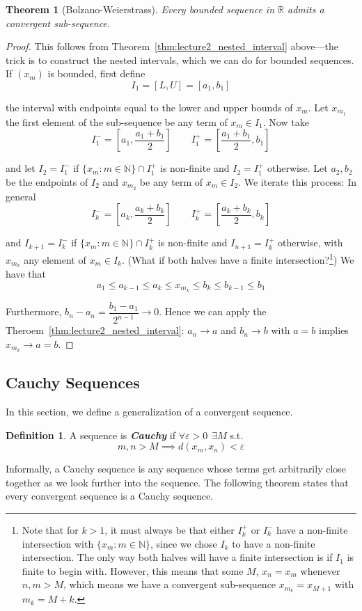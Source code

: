 \documentclass{article}
\newcommand{\R}{\mathbb{R}}
\newcommand{\N}{\mathbb{N}}
\newcommand{\keyword}[1]{\textit{\textbf{#1}}\index{#1}}
\newtheorem{theorem}{Theorem}
\theoremstyle{definition}
\newtheorem{definition}{Definition}
\begin{document}
\begin{theorem}[Bolzano-Weierstrass]
  Every bounded sequence in $\R$ admits a convergent sub-sequence.
\end{theorem}

\begin{proof}
  This follows from Theorem~\ref{thm:lecture2_nested_interval} above---the trick is to construct the nested intervals, which we can do for bounded sequences. If $(x_m)$ is bounded, first define
  \[
    I_1 = [L, U] = [a_1, b_1]
  \]

  the interval with endpoints equal to the lower and upper bounds of $x_m$. Let $x_{m_1}$ the first element of the sub-sequence be any term of $x_m \in I_1$. Now take
  \[
    I_1^- = \left[a_1, \dfrac{a_1 + b_1}{2}\right]
    \quad\quad
    I_1^+ = \left[\dfrac{a_1 + b_1}{2}, b_1\right]
  \]

  and let $I_2 = I_1^-$ if $\{x_m: m \in \N\} \cap I_1^+$ is non-finite and $I_2 = I_1^+$ otherwise. Let $a_2, b_2$ be the endpoints of $I_2$ and $x_{m_2}$ be any term of $x_m \in I_2$. We iterate this process: In general
  \[
    I_k^- = \left[a_k, \dfrac{a_k + b_k}{2}\right]
    \quad\quad
    I_k^+ = \left[\dfrac{a_k + b_k}{2}, b_k\right]
  \]

  and $I_{k + 1} = I_k^-$ if $\{x_m: m \in \N\} \cap I_k^+$ is non-finite and $I_{n + 1} = I_k^+$ otherwise, with $x_{m_k}$ any element of $x_m \in I_k$. (What if both halves have a finite intersection?\footnote{Note that for $k > 1$, it must always be that either $I_k^+$ or $I_k^-$ have a non-finite intersection with $\{x_m: m \in \mathbb{N}\}$, since we chose $I_k$ to have a non-finite intersection.  The only way both halves will have a finite intersection is if $I_1$ is finite to begin with. However, this means that some $M$, $x_n = x_m$ whenever $n, m > M$, which means we have a convergent sub-sequence $x_{m_k} = x_{M + 1}$ with $m_k = M + k$.}) We have that
  \[
    a_1 \le a_{k - 1} \le a_k \le x_{m_k} \le b_k \le b_{k - 1} \le b_1
  \]

  Furthermore, $b_n - a_n = \dfrac{b_1 - a_1}{2^{n - 1}} \to 0$. Hence we can apply the Theroem~\ref{thm:lecture2_nested_interval}: $a_n \to a$ and $b_n \to b$ with $a = b$ implies $x_{m_k} \to a = b$.
\end{proof}

\subsection{Cauchy Sequences}
\label{ssub:cauchy_sequences}
In this section, we define a generalization of a convergent sequence. 
\begin{definition}
  A sequence is \keyword{Cauchy} if $\forall \varepsilon > 0 ~~\exists M$ s.t.
  \[
    m, n > M \implies d(x_m, x_n) < \varepsilon
  \]
\end{definition}
Informally, a Cauchy sequence is any sequence whose terms get arbitrarily close together as we look further into the sequence. The following theorem states that every convergent sequence is a Cauchy sequence. 
\end{document}
